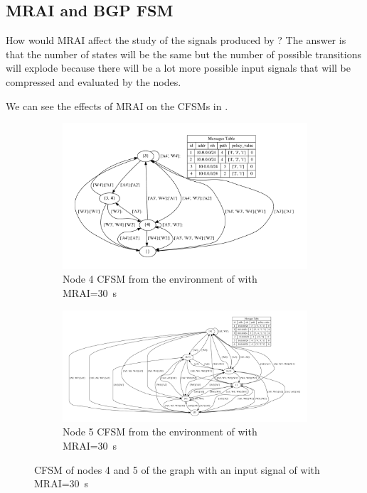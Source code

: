 \subsection{MRAI and BGP FSM}
\label{subsec:mrai_vs_bgpfsm}

How would \ac{MRAI} affect the study of the signals produced by ?
The answer is that the number of states will be the same but the number of possible
transitions will explode because there will be a lot more possible
input signals that will be compressed and evaluated by the nodes.

We can see the effects of \ac{MRAI} on the \ac{CFSM}s in .

\begin{figure}[h]
     \centering
     \begin{subfigure}[b]{0.7\textwidth}
         \centering
         \includegraphics[width=\textwidth]{images/fsm/fig_4_4_MRAI30.pdf}
		 \caption{Node \num{4} \ac{CFSM} from the environment of  with \ac{MRAI}=\SI{30}{\second}}
         \label{fig:fsm_node4_MRAI}
     \end{subfigure}
     \hfill
     \begin{subfigure}[b]{0.9\textwidth}
         \centering
         \includegraphics[width=\textwidth]{images/fsm/fig_4_5_MRAI30.pdf}
		 \caption{Node \num{5} \ac{CFSM} from the environment of  with \ac{MRAI}=\SI{30}{\second}}
         \label{fig:fsm_node5_MRAI}
     \end{subfigure}
		\caption{\ac{CFSM} of nodes \num{4} and \num{5} of the graph
			 with an input signal of  with
			\ac{MRAI}=\SI{30}{\second}}
        \label{fig:fsm_griffin_fig4_MRAI}
\end{figure}

